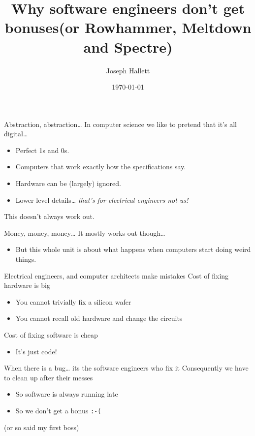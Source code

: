\documentclass[9pt,aspectratio=169]{beamer}
\author{Joseph Hallett}
\date{\today}
\title{Why software engineers don't get bonuses\newline{}(or Rowhammer, Meltdown and Spectre)}
\begin{document}
\maketitle

\begin{frame}[label={sec:orgad2f548}]{Abstraction, abstraction\ldots{}}
In computer science we like to pretend that it's all digital\ldots{}
\begin{itemize}
\item Perfect 1s and 0s.
\item Computers that work exactly how the specifications say.
\item Hardware can be (largely) ignored.
\item Lower level details\ldots{} \emph{that's for electrical engineers not us!}
\end{itemize}

\begin{block}{This doesn't always work out.}
\end{block}
\end{frame}

\begin{frame}[label={sec:org5a290b8},fragile]{Money, money, money\ldots{}}
 It mostly works out though\ldots{}
\begin{itemize}
\item But this whole unit is about what happens when computers start doing weird things.
\end{itemize}

\begin{block}{Electrical engineers, and computer architects make mistakes}
Cost of fixing hardware is big
\begin{itemize}
\item You cannot trivially fix a silicon wafer
\item You cannot recall old hardware and change the circuits
\end{itemize}

Cost of fixing software is cheap
\begin{itemize}
\item It's just code!
\end{itemize}
\end{block}

\begin{block}{When there is a bug\ldots{} its the software engineers who fix it}
Consequently we have to clean up after their messes
\begin{itemize}
\item So software is always running late
\item So we don't get a bonus \texttt{:-(}

\vfill
\footnotesize
\end{itemize}
(or so said my first boss)
\end{block}
\end{frame}
\end{document}
